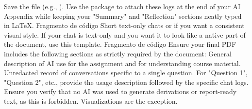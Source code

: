 Save the file (e.g., ).\markdownRendererOlItemEnd 
\markdownRendererOlEnd \markdownRendererInterblockSeparator
{} Use the  package to attach these logs at the end of your AI Appendix while keeping your "Summary" and "Reflection" sections neatly typed in LaTeX.\markdownRendererInterblockSeparator
{}Fragmento de código\markdownRendererInterblockSeparator
{}\markdownRendererInterblockSeparator
{}\markdownRendererThematicBreak{}\markdownRendererInterblockSeparator
{}
\markdownRendererSectionEnd \markdownRendererSectionBegin
{}\markdownRendererInterblockSeparator
{} Short text-only chats or if you want a consistent visual style. If your chat is text-only and you want it to look like a native part of the document, use this  template.\markdownRendererInterblockSeparator
{}Fragmento de código\markdownRendererInterblockSeparator
{}\markdownRendererInterblockSeparator
{}
\markdownRendererSectionEnd \markdownRendererSectionBegin
{}\markdownRendererInterblockSeparator
{}Ensure your final PDF includes the following sections as strictly required by the document:\markdownRendererInterblockSeparator
{}\markdownRendererOlBegin
{} General description of AI use for the assignment and for understanding course material.\markdownRendererOlItemEnd 
{} Unredacted record of conversations  specific to a single question.\markdownRendererOlItemEnd 
{} For "Question 1", "Question 2", etc., provide the usage description followed by the specific chat logs.\markdownRendererOlItemEnd 
{} Ensure you verify that no AI was used to generate derivations or report-ready text, as this is forbidden. Visualizations are the exception.\markdownRendererOlItemEnd 
